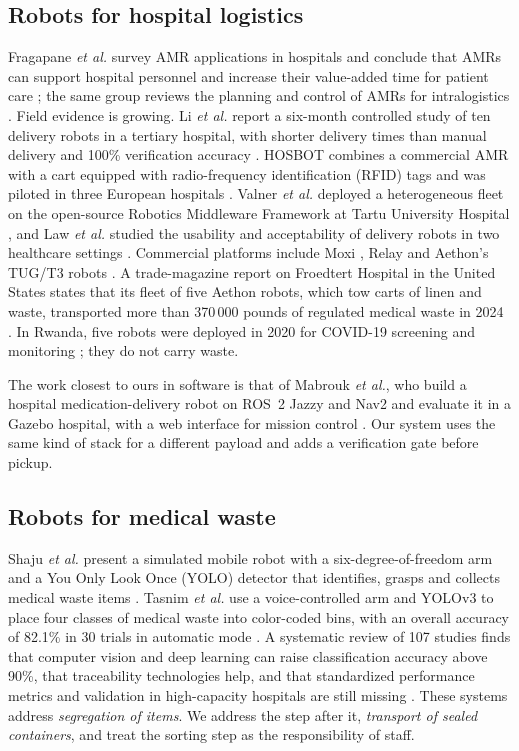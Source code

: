 \documentclass[conference]{IEEEtran}
\begin{document}
\subsection{Robots for hospital logistics}
Fragapane \emph{et al.} survey AMR applications in hospitals and conclude that AMRs can support hospital personnel and increase their value-added time for patient care \cite{fragapane2020amr}; the same group reviews the planning and control of AMRs for intralogistics \cite{fragapane2021planning}. Field evidence is growing. Li \emph{et al.} report a six-month controlled study of ten delivery robots in a tertiary hospital, with shorter delivery times than manual delivery and 100\% verification accuracy \cite{li2026hospital}. HOSBOT combines a commercial AMR with a cart equipped with radio-frequency identification (RFID) tags and was piloted in three European hospitals \cite{dei2026hosbot}. Valner \emph{et al.} deployed a heterogeneous fleet on the open-source Robotics Middleware Framework at Tartu University Hospital \cite{valner2022rmf}, and Law \emph{et al.} studied the usability and acceptability of delivery robots in two healthcare settings \cite{law2021gocart}. Commercial platforms include Moxi \cite{moxi}, Relay \cite{relay} and Aethon's TUG/T3 robots \cite{aethon}. A trade-magazine report on Froedtert Hospital in the United States states that its fleet of five Aethon robots, which tow carts of linen and waste, transported more than 370\,000 pounds of regulated medical waste in 2024 \cite{hfm2025froedtert}. In Rwanda, five robots were deployed in 2020 for COVID-19 screening and monitoring \cite{who_rwanda}; they do not carry waste.

The work closest to ours in software is that of Mabrouk \emph{et al.}, who build a hospital medication-delivery robot on ROS~2 Jazzy and Nav2 and evaluate it in a Gazebo hospital, with a web interface for mission control \cite{mabrouk2025ros2med}. Our system uses the same kind of stack for a different payload and adds a verification gate before pickup.

\subsection{Robots for medical waste}
Shaju \emph{et al.} present a simulated mobile robot with a six-degree-of-freedom arm and a You Only Look Once (YOLO) detector that identifies, grasps and collects medical waste items \cite{shaju2023medwaste}. Tasnim \emph{et al.} use a voice-controlled arm and YOLOv3 to place four classes of medical waste into color-coded bins, with an overall accuracy of 82.1\% in 30 trials in automatic mode \cite{tasnim2022voice}. A systematic review of 107 studies finds that computer vision and deep learning can raise classification accuracy above 90\%, that traceability technologies help, and that standardized performance metrics and validation in high-capacity hospitals are still missing \cite{bonifacio2025review}. These systems address \emph{segregation of items}. We address the step after it, \emph{transport of sealed containers}, and treat the sorting step as the responsibility of staff.
\end{document}

